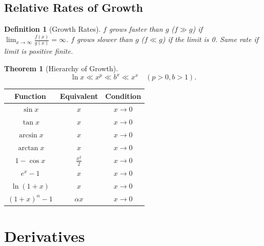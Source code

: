 \documentclass[11pt,a4paper]{article}
\newtheorem{theorem}{Theorem}
\newtheorem{definition}{Definition}
\begin{document}
\subsection{Relative Rates of Growth}
\begin{definition}[Growth Rates]
$f$ grows faster than $g$ ($f \gg g$) if $\lim_{x \to \infty} \frac{f(x)}{g(x)} = \infty$. $f$ grows slower than $g$ ($f \ll g$) if the limit is 0. Same rate if limit is positive finite.
\end{definition}
\begin{theorem}[Hierarchy of Growth]
\[
\ln x \ll x^p \ll b^x \ll x^x \quad (p > 0, b > 1).
\]
\end{theorem}
\begin{center}
\begin{tabular}{|c|c|c|}
\hline
\textbf{Function} & \textbf{Equivalent} & \textbf{Condition} \\
\hline
$\sin x$ & $x$ & $x \to 0$ \\
$\tan x$ & $x$ & $x \to 0$ \\
$\arcsin x$ & $x$ & $x \to 0$ \\
$\arctan x$ & $x$ & $x \to 0$ \\
$1 - \cos x$ & $\frac{x^2}{2}$ & $x \to 0$ \\
$e^x - 1$ & $x$ & $x \to 0$ \\
$\ln(1+x)$ & $x$ & $x \to 0$ \\
$(1+x)^\alpha - 1$ & $\alpha x$ & $x \to 0$ \\
\hline
\end{tabular}
\end{center}
\section{Derivatives}
\end{document}

